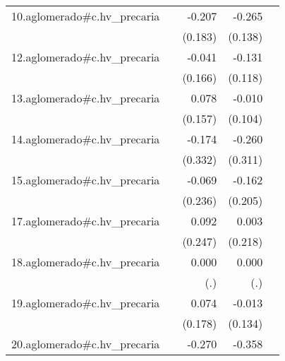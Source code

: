 {\begin{longtable}{l*{4}{D{.}{.}{-1}}}
\addlinespace
10.aglomerado#c.hv\_precaria&                     &      -0.207         &      -0.265         &                     \\
            &                     &     (0.183)         &     (0.138)         &                     \\
\addlinespace
12.aglomerado#c.hv\_precaria&                     &      -0.041         &      -0.131         &                     \\
            &                     &     (0.166)         &     (0.118)         &                     \\
\addlinespace
13.aglomerado#c.hv\_precaria&                     &       0.078         &      -0.010         &                     \\
            &                     &     (0.157)         &     (0.104)         &                     \\
\addlinespace
14.aglomerado#c.hv\_precaria&                     &      -0.174         &      -0.260         &                     \\
            &                     &     (0.332)         &     (0.311)         &                     \\
\addlinespace
15.aglomerado#c.hv\_precaria&                     &      -0.069         &      -0.162         &                     \\
            &                     &     (0.236)         &     (0.205)         &                     \\
\addlinespace
17.aglomerado#c.hv\_precaria&                     &       0.092         &       0.003         &                     \\
            &                     &     (0.247)         &     (0.218)         &                     \\
\addlinespace
18.aglomerado#c.hv\_precaria&                     &       0.000         &       0.000         &                     \\
            &                     &         (.)         &         (.)         &                     \\
\addlinespace
19.aglomerado#c.hv\_precaria&                     &       0.074         &      -0.013         &                     \\
            &                     &     (0.178)         &     (0.134)         &                     \\
\addlinespace
20.aglomerado#c.hv\_precaria&                     &      -0.270         &      -0.358         &                     \\

\end{longtable}}
